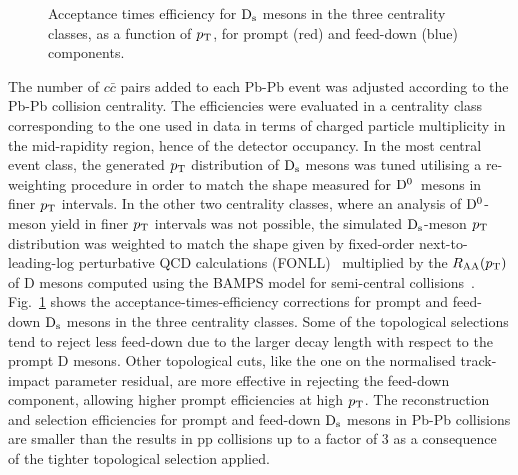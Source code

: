 \begin{figure}[!b]
\caption{Acceptance times efficiency for ${\rm D_s}$ mesons in the three centrality classes, as a function of $p_{\rm T}$, for prompt (red) and feed-down (blue) components.}
\label{fig:DsAccEff}
\end{figure}
The number of $c\bar{c}$ pairs added to each Pb-Pb 
event was adjusted according to the Pb-Pb collision centrality. 
The efficiencies were evaluated in a centrality class 
corresponding to the one used in 
data in terms of charged particle 
multiplicity in the mid-rapidity region, hence of the detector occupancy.
In the most central event class, the generated $p_{\rm T}$ distribution 
of ${\rm D_s}$ mesons was tuned utilising a re-weighting procedure in order to match the 
shape measured for \mbox{$\rm D^0$ mesons} in finer 
$p_{\rm T}$ intervals. In the other two centrality classes, 
where an analysis of ${\rm D^0}$-meson yield in finer $p_{\rm T}$ intervals was not possible, 
the simulated ${\rm D_s}$-meson $p_{\rm T}$ distribution was weighted 
to match the shape given by fixed-order next-to-leading-log 
perturbative QCD calculations (FONLL)~\cite{Cacciari:1998it,Cacciari:2001td} 
multiplied by the $R_{\rm AA}(p_{\rm T})$ of D mesons computed 
using the BAMPS model for semi-central 
collisions~\cite{Uphoff:2011ad,Fochler:2011en,Uphoff:2012gb}.
Fig.~\ref{fig:DsAccEff} shows the acceptance-times-efficiency 
corrections for prompt and feed-down ${\rm D_s}$ mesons in the three
centrality classes.
Some of the topological selections tend to reject 
less feed-down due to the larger 
decay length with respect to the prompt D mesons. 
Other topological cuts, like the one on the normalised 
track-impact parameter residual, are more effective
in rejecting the feed-down component, allowing higher 
prompt efficiencies at high $p_{\rm T}$.
The reconstruction and selection efficiencies for prompt and feed-down
${\rm D_s}$ mesons in Pb-Pb collisions are smaller than the results in pp 
collisions up to a factor of 3 as a consequence of
the tighter topological selection applied. \\

